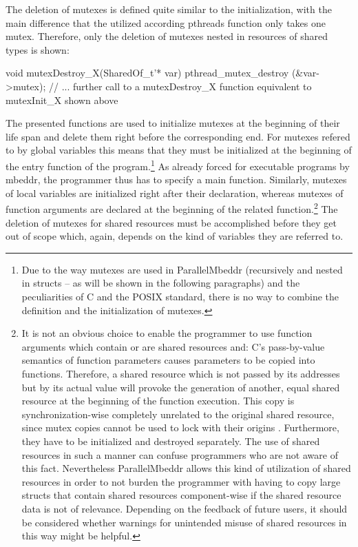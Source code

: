 The deletion of mutexes is defined quite similar to the initialization, with the main difference that the utilized according pthreads function only takes one mutex. Therefore, only the deletion of mutexes nested in resources of shared types is shown:
\begin{ccode}
void mutexDestroy_X(SharedOf_t'* var) { 
  pthread_mutex_destroy (&var->mutex); 
  // ... further call to a mutexDestroy_X function equivalent to mutexInit_X shown above
}
\end{ccode}
The presented functions are used to initialize mutexes at the beginning of their life span and delete them right before the corresponding end. For mutexes refered to by global variables this means that they must be initialized at the beginning of the entry function of the program.\footnote{Due to the way mutexes are used in ParallelMbeddr (recursively and nested in structs -- as will be shown in the following paragraphs) and the peculiarities of C and the POSIX standard, there is no way to combine the definition and the initialization of mutexes.} As already forced for executable programs by mbeddr, the programmer thus has to specify a main function. Similarly, mutexes of local variables are initialized right after their declaration, whereas mutexes of function arguments are declared at the beginning of the related function.\footnote{\label{mutexCopies}It is not an obvious choice to enable the programmer to use function arguments which contain or are shared resources and: C's pass-by-value semantics of function parameters causes parameters to be copied into functions. Therefore, a shared resource which is not passed by its addresses but by its actual value will provoke the generation of another, equal shared resource at the beginning of the function execution. This copy is synchronization-wise completely unrelated to the original shared resource, since mutex copies cannot be used to lock with their origins \cite{Mutexes}. Furthermore, they have to be initialized and destroyed separately. The use of shared resources in such a manner can confuse programmers who are not aware of this fact. Nevertheless ParallelMbeddr allows this kind of utilization of shared resources in order to not burden the programmer with having to copy large structs that contain shared resources component-wise if the shared resource data is not of relevance. Depending on the feedback of future users, it should be considered whether warnings for unintended misuse of shared resources in this way might be helpful.} The deletion of mutexes for shared resources must be accomplished before they get out of scope which, again, depends on the kind of variables they are referred to. 

